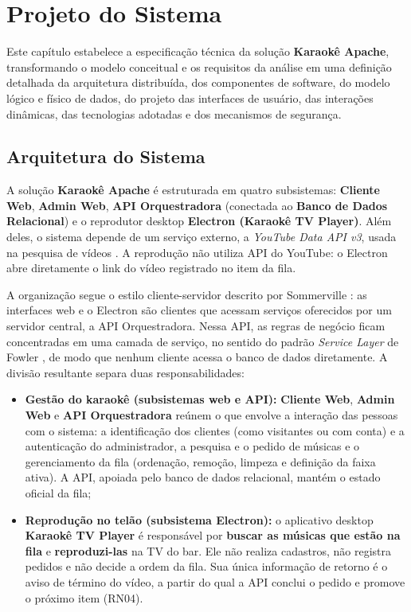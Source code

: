 \chapter{Projeto do Sistema} \label{cap:projeto}

Este capítulo estabelece a especificação técnica da solução \textbf{Karaokê Apache}, transformando o modelo conceitual e os requisitos da análise em uma definição detalhada da arquitetura distribuída, dos componentes de software, do modelo lógico e físico de dados, do projeto das interfaces de usuário, das interações dinâmicas, das tecnologias adotadas e dos mecanismos de segurança.

\section{Arquitetura do Sistema} \label{sec:arquitetura}

A solução \textbf{Karaokê Apache} é estruturada em quatro subsistemas: \textbf{Cliente Web}, \textbf{Admin Web}, \textbf{API Orquestradora} (conectada ao \textbf{Banco de Dados Relacional}) e o reprodutor desktop \textbf{Electron (Karaokê TV Player)}. Além deles, o sistema depende de um serviço externo, a \textit{YouTube Data API v3}, usada na pesquisa de vídeos \cite{youtubedataapi2026}. A reprodução não utiliza API do YouTube: o Electron abre diretamente o link do vídeo registrado no item da fila.

A organização segue o estilo cliente-servidor descrito por Sommerville \cite{sommerville2019}: as interfaces web e o Electron são clientes que acessam serviços oferecidos por um servidor central, a API Orquestradora. Nessa API, as regras de negócio ficam concentradas em uma camada de serviço, no sentido do padrão \textit{Service Layer} de Fowler \cite{fowler2006}, de modo que nenhum cliente acessa o banco de dados diretamente. A divisão resultante separa duas responsabilidades:

\begin{itemize}
  \item \textbf{Gestão do karaokê (subsistemas web e API):} \textbf{Cliente Web}, \textbf{Admin Web} e \textbf{API Orquestradora} reúnem o que envolve a interação das pessoas com o sistema: a identificação dos clientes (como visitantes ou com conta) e a autenticação do administrador, a pesquisa e o pedido de músicas e o gerenciamento da fila (ordenação, remoção, limpeza e definição da faixa ativa). A API, apoiada pelo banco de dados relacional, mantém o estado oficial da fila;
  \item \textbf{Reprodução no telão (subsistema Electron):} o aplicativo desktop \textbf{Karaokê TV Player} é responsável por \textbf{buscar as músicas que estão na fila} e \textbf{reproduzi-las} na TV do bar. Ele não realiza cadastros, não registra pedidos e não decide a ordem da fila. Sua única informação de retorno é o aviso de término do vídeo, a partir do qual a API conclui o pedido e promove o próximo item (RN04).
\end{itemize}

